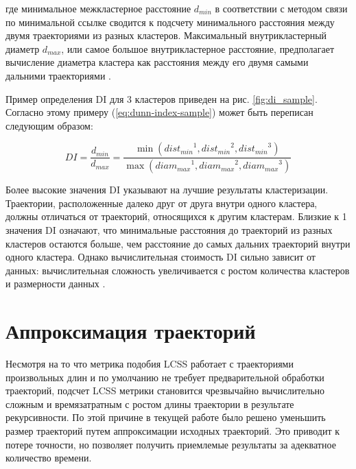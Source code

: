 где минимальное межкластерное расстояние $d_{min}$ в соответствии с методом связи по минимальной ссылке сводится к подсчету минимального расстояния между двумя траекториями из разных кластеров. Максимальный внутрикластерный диаметр $d_{max}$, или самое большое внутрикластерное расстояние, предполагает вычисление диаметра кластера как расстояния между его двумя самыми дальними траекториями \cite{inproceedings:clust_ind}.

Пример определения DI для 3 кластеров приведен на рис. \ref{fig:di_sample}. Согласно этому примеру (\ref{eq:dunn-index-sample}) может быть переписан следующим образом:

\begin{equation} \label{eq:dunn-index-sample}
DI = \frac {d_{min}} {d_{max}} = \frac
	{\min ({dist_{min}}^1, {dist_{min}}^2, {dist_{min}}^3)}
	{\max ({diam_{max}}^1, {diam_{max}}^2, {diam_{max}}^3)}
\end{equation}


Более высокие значения DI указывают на лучшие результаты кластеризации. Траектории, расположенные далеко друг от друга внутри одного кластера, должны отличаться от траекторий, относящихся к другим кластерам. Близкие к 1 значения DI означают, что минимальные расстояния до траекторий из разных кластеров остаются больше, чем расстояние до самых дальних траекторий внутри одного кластера. Однако вычислительная стоимость DI сильно зависит от данных: вычислительная сложность увеличивается с ростом количества кластеров и размерности данных \cite{online:dunn_cl_valid}.

\section{Аппроксимация траекторий}

Несмотря на то что метрика подобия LCSS работает с траекториями произвольных длин и по умолчанию не требует предварительной обработки траекторий, подсчет LCSS метрики становится чрезвычайно вычислительно сложным и времязатратным с ростом длины траектории в результате рекурсивности. По этой причине в текущей работе было решено уменьшить размер траекторий путем аппроксимации исходных траекторий. Это приводит к потере точности, но позволяет получить приемлемые результаты за адекватное количество времени.

